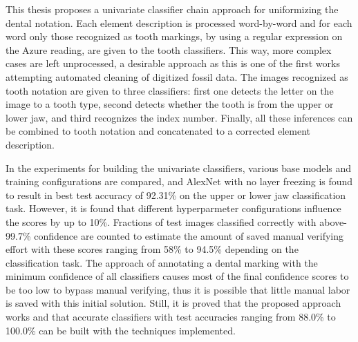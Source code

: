 \documentclass[english,twoside,openright]{UH_DS_MSc}
\begin{document}
This thesis proposes a univariate classifier chain approach for 
uniformizing the dental notation. Each element description is processed 
word-by-word and for each word only those recognized as tooth markings, 
by using a regular expression on the Azure reading, are given to the tooth 
classifiers. This way, more complex cases are left unprocessed, a desirable
approach as this is one of the first works attempting automated cleaning 
of digitized fossil data. The images recognized as tooth notation are given 
to three classifiers: first one detects the letter on the image to a 
tooth type, second detects whether the tooth is from the upper or lower jaw,
and third recognizes the index number. Finally, all these inferences can 
be combined to tooth notation and concatenated to a corrected element 
description. 

In the experiments for building the univariate classifiers, various base models and training configurations are compared, and 
AlexNet with no layer freezing is found to result in best test accuracy of 92.31\% on the 
upper or lower jaw classification task. However, it is found that different hyperparmeter 
configurations influence the scores by up to 10\%. 
Fractions of test images classified correctly with above-99.7\% confidence are 
counted to estimate the amount of saved manual verifying effort with these scores ranging 
from 58\% to 94.5\% depending on the classification task.
The approach of annotating a dental marking with the minimum 
confidence of all classifiers causes most of the final confidence scores 
to be too low to bypass manual verifying, thus it is possible that little manual labor is 
saved with this initial solution. Still, it is proved that the proposed approach works and that 
accurate classifiers with test accuracies ranging from 88.0\% to 100.0\% can be built 
with the techniques implemented.

\end{document}
